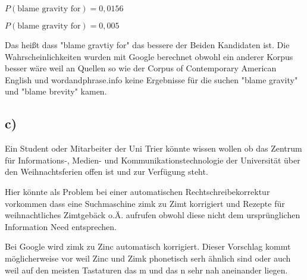 \documentclass[11pt,a4paper,parskip=half ]{scrartcl}
\begin{document}
		$P(\text{blame gravity for}) = 0,0156$ 
		
		$P(\text{blame gravity for}) = 0,005$ 
		
		Das heißt dass "blame gravtiy for" das bessere der Beiden Kandidaten ist. Die Wahrscheinlichkeiten wurden mit Google berechnet obwohl ein anderer Korpus besser wäre weil an Quellen so wie der Corpus of Contemporary American English und wordandphrase.info keine Ergebnisse für die suchen "blame gravity" und "blame brevity" kamen.
		
		\subsection*{c)} Ein Student oder Mitarbeiter der Uni Trier könnte wissen wollen ob das Zentrum für Informations-, Medien- und Kommunikationstechnologie der Universität über den Weihnachtsferien offen ist und zur Verfügung steht. 
		
		Hier könnte als Problem bei einer automatischen Rechtschreibekorrektur vorkommen dass eine Suchmaschine zimk zu Zimt korrigiert und Rezepte für weihnachtliches Zimtgebäck o.Ä. aufrufen obwohl diese nicht dem ursprünglichen Information Need entsprechen.
		
		Bei Google wird zimk zu Zinc automatisch korrigiert. Dieser Vorschlag kommt möglicherweise vor weil Zinc und Zimk phonetisch serh ähnlich sind oder auch weil auf den meisten Tastaturen das m und das n sehr nah aneinander liegen.
\end{document}
